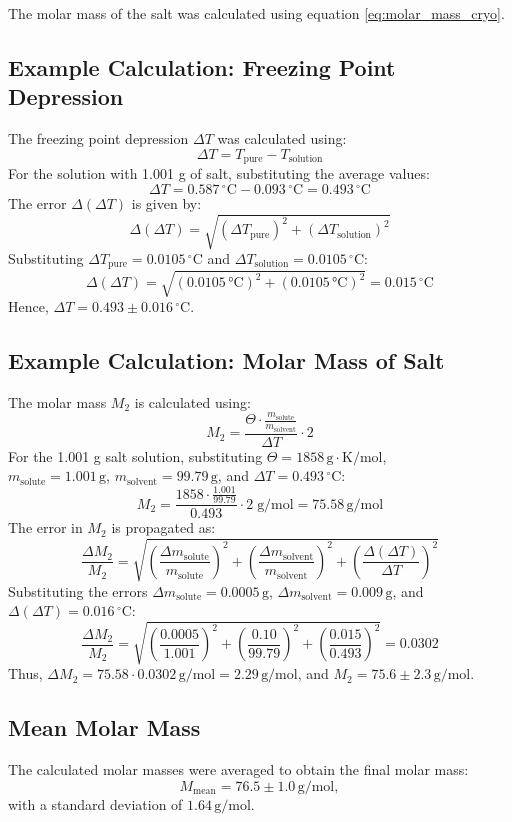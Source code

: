 \documentclass[a4paper,12pt]{article}
\begin{document}
The molar mass of the salt was calculated using equation \ref{eq:molar_mass_cryo}.

\subsection*{Example Calculation: Freezing Point Depression}
The freezing point depression $\Delta T$ was calculated using:
\[
\Delta T = T_{\text{pure}} - T_{\text{solution}}
\]
For the solution with 1.001 g of salt, substituting the average values:
\[
\Delta T = 0.587 \, ^\circ\text{C} - 0.093 \, ^\circ\text{C}= 0.493 \, ^\circ\text{C}
\]
The error $\Delta (\Delta T)$ is given by:
\[
\Delta (\Delta T) = \sqrt{(\Delta T_{\text{pure}})^2 + (\Delta T_{\text{solution}})^2}
\]
Substituting $\Delta T_{\text{pure}} = 0.0105 \, ^\circ\text{C}$ and $\Delta T_{\text{solution}} = 0.0105 \, ^\circ\text{C}$:
\[
\Delta (\Delta T) = \sqrt{(0.0105\,\si{\celsius})^2 + (0.0105\,\si{\celsius})^2} = 0.015 \, ^\circ\text{C}
\]
Hence, $\Delta T = 0.493 \pm 0.016 \, ^\circ\text{C}$.

\subsection*{Example Calculation: Molar Mass of Salt}
The molar mass $M_2$ is calculated using:
\[
M_2 = \frac{\Theta \cdot \frac{m_{\text{solute}}}{m_{\text{solvent}}}}{\Delta T} \cdot 2
\]
For the 1.001 g salt solution, substituting $\Theta = 1858 \, \text{g} \cdot \text{K/mol}$, \\ $m_{\text{solute}} = 1.001 \, \text{g}$, $m_{\text{solvent}} = 99.79 \, \text{g}$, and $\Delta T = 0.493 \, ^\circ\text{C}$:
\[
M_2 = \frac{1858 \cdot \frac{1.001}{99.79}}{0.493} \cdot 2 \;\text{g/mol}= 75.58 \, \text{g/mol}
\]
The error in $M_2$ is propagated as:
\[
\frac{\Delta M_2}{M_2} = \sqrt{\left(\frac{\Delta m_{\text{solute}}}{m_{\text{solute}}}\right)^2 + \left(\frac{\Delta m_{\text{solvent}}}{m_{\text{solvent}}}\right)^2 + \left(\frac{\Delta (\Delta T)}{\Delta T}\right)^2}
\]
Substituting the errors $\Delta m_{\text{solute}} = 0.0005 \, \text{g}$, $\Delta m_{\text{solvent}} = 0.009 \, \text{g}$, and $\Delta (\Delta T) = 0.016 \, ^\circ\text{C}$:
\[
\frac{\Delta M_2}{M_2} = \sqrt{\left(\frac{0.0005}{1.001}\right)^2 + \left(\frac{0.10}{99.79}\right)^2 + \left(\frac{0.015}{0.493}\right)^2} = 0.0302
\]
Thus, $\Delta M_2 = 75.58 \cdot 0.0302 \,\text{g/mol}= 2.29 \, \text{g/mol}$, and $M_2 = 75.6 \pm 2.3 \, \text{g/mol}$.

\subsection{Mean Molar Mass}
The calculated molar masses were averaged to obtain the final molar mass:
\begin{equation}
M_{\text{mean}} = 76.5 \pm 1.0 \, \text{g/mol},
\end{equation}
with a standard deviation of $1.64 \, \text{g/mol}$. 
\end{document}

